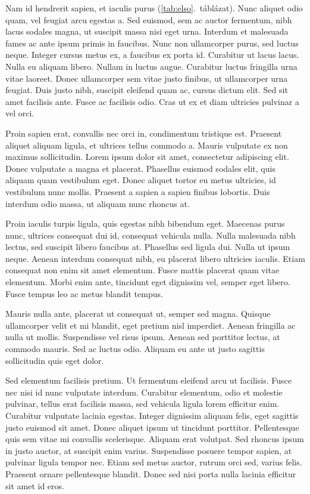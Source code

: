 \documentclass[a4paper,12pt]{article} %
\begin{document}
Nam id hendrerit sapien, et iaculis purus (\ref{tab:elso}.~táblázat). Nunc aliquet odio quam, vel feugiat arcu egestas a. Sed euismod, sem ac auctor fermentum, nibh lacus sodales magna, ut suscipit massa nisi eget urna. Interdum et malesuada fames ac ante ipsum primis in faucibus. Nunc non ullamcorper purus, sed luctus neque. Integer cursus metus ex, a faucibus ex porta id. Curabitur ut lacus lacus. Nulla eu aliquam libero. Nullam in luctus augue. Curabitur luctus fringilla urna vitae laoreet. Donec ullamcorper sem vitae justo finibus, ut ullamcorper urna feugiat. Duis justo nibh, suscipit eleifend quam ac, cursus dictum elit. Sed sit amet facilisis ante. Fusce ac facilisis odio. Cras ut ex et diam ultricies pulvinar a vel orci.

Proin sapien erat, convallis nec orci in, condimentum tristique est. Praesent aliquet aliquam ligula, et ultrices tellus commodo a. Mauris vulputate ex non maximus sollicitudin. Lorem ipsum dolor sit amet, consectetur adipiscing elit. Donec vulputate a magna et placerat. Phasellus euismod sodales elit, quis aliquam quam vestibulum eget. Donec aliquet tortor eu metus ultricies, id vestibulum nunc mollis. Praesent a sapien a sapien finibus lobortis. Duis interdum odio massa, ut aliquam nunc rhoncus at.

Proin iaculis turpis ligula, quis egestas nibh bibendum eget. Maecenas purus nunc, ultrices consequat dui id, consequat vehicula nulla. Nulla malesuada nibh lectus, sed suscipit libero faucibus at. Phasellus sed ligula dui. Nulla ut ipsum neque. Aenean interdum consequat nibh, eu placerat libero ultricies iaculis. Etiam consequat non enim sit amet elementum. Fusce mattis placerat quam vitae elementum. Morbi enim ante, tincidunt eget dignissim vel, semper eget libero. Fusce tempus leo ac metus blandit tempus.

Mauris nulla ante, placerat ut consequat ut, semper sed magna. Quisque ullamcorper velit et mi blandit, eget pretium nisl imperdiet. Aenean fringilla ac nulla ut mollis. Suspendisse vel risus ipsum. Aenean sed porttitor lectus, at commodo mauris. Sed ac luctus odio. Aliquam eu ante ut justo sagittis sollicitudin quis eget dolor.

Sed elementum facilisis pretium. Ut fermentum eleifend arcu ut facilisis. Fusce nec nisi id nunc vulputate interdum. Curabitur elementum, odio et molestie pulvinar, tellus erat facilisis massa, sed vehicula ligula lorem efficitur enim. Curabitur vulputate lacinia egestas. Integer dignissim aliquam felis, eget sagittis justo euismod sit amet. Donec aliquet ipsum ut tincidunt porttitor. Pellentesque quis sem vitae mi convallis scelerisque. Aliquam erat volutpat. Sed rhoncus ipsum in justo auctor, at suscipit enim varius. Suspendisse posuere tempor sapien, at pulvinar ligula tempor nec. Etiam sed metus auctor, rutrum orci sed, varius felis. Praesent ornare pellentesque blandit. Donec sed nisi porta nulla lacinia efficitur sit amet id eros.
\end{document}
